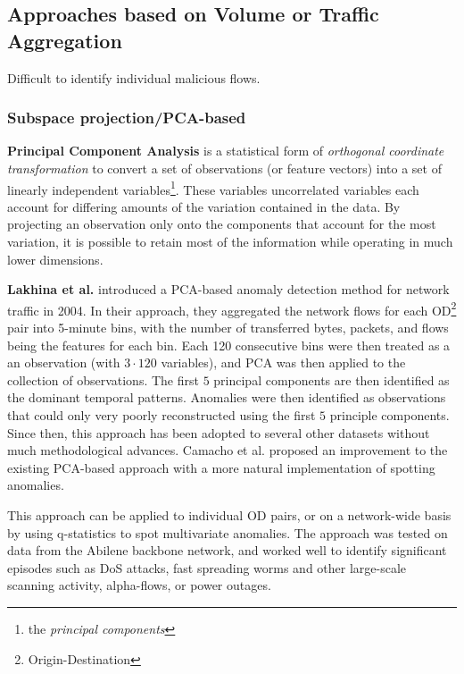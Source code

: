 \documentclass[a4paper,12pt,twoside]{report}
\begin{document}

\subsection{Approaches based on Volume or Traffic Aggregation}

Difficult to identify individual malicious flows.


\subsubsection{Subspace projection/PCA-based}

\textbf{Principal Component Analysis} is a statistical form of \textit{orthogonal coordinate transformation} to convert a set of observations (or feature vectors) into a set of linearly independent variables\footnote{the \textit{principal components}}. These variables uncorrelated variables each account for differing amounts of the variation contained in the data. By projecting an observation only onto the components that account for the most variation, it is possible to retain most of the information while operating in much lower dimensions.

\textbf{Lakhina et al.} \cite{lakhina_diagnosing_2004,lakhina_characterization_2004}  introduced a PCA-based anomaly detection method for network traffic in 2004. In their approach, they aggregated the network flows for each OD\footnote{Origin-Destination} pair into 5-minute bins, with the number of transferred bytes, packets, and flows being the features for each bin. Each 120 consecutive bins were then treated as a an observation (with $3\cdot 120$ variables), and PCA was then applied to the collection of observations. The first $5$ principal components are then identified as the dominant temporal patterns. Anomalies were then identified as observations that could only very poorly reconstructed using the first $5$ principle components. Since then, this approach has been adopted to several other datasets without much methodological advances. Camacho et al. \cite{camacho_pca-based_2016} proposed an improvement to the existing PCA-based approach with a more natural implementation of spotting anomalies. 

This approach can be applied to individual OD pairs, or on a network-wide basis by using q-statistics to spot multivariate anomalies. The approach was tested on data from the Abilene backbone network, and worked well to identify significant episodes such as DoS attacks, fast spreading worms and other large-scale scanning activity, alpha-flows, or power outages. 
\end{document}
